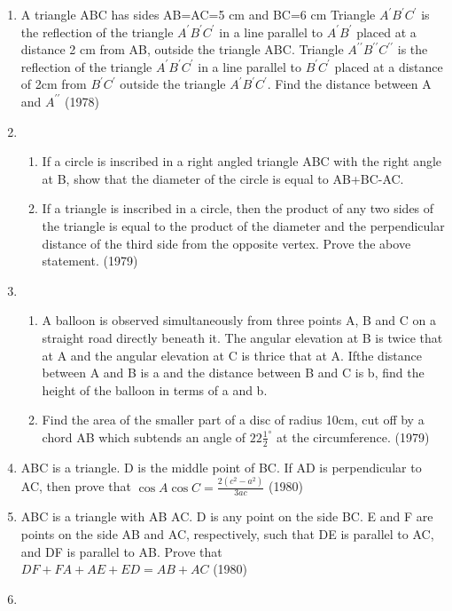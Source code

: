 \documentclass[12pt]{article}
\begin{document}
\begin{enumerate}
\item A triangle ABC has sides AB=AC=5 cm and BC=6 cm Triangle $A^{\prime} B^{\prime} C^{\prime}$ is the reflection of the triangle $A^{\prime} B^{\prime} C^{\prime}$ in a line parallel to $A^{\prime} B^{\prime}$ placed at a distance 2 cm from AB, outside the triangle ABC. Triangle $A^{\prime\prime} B^{\prime\prime} C^{\prime\prime}$ is the reflection of the triangle $A^{\prime} B^{\prime} C^{\prime}$ in a line parallel to $B^\prime C^\prime$ placed at a distance of 2cm from $B^{\prime} C^{\prime}$ outside the triangle $A^{\prime} B^{\prime} C^{\prime}$. Find the distance between A and $A^{\prime\prime}$ (1978)
\item 
\begin{enumerate}
\item If a circle is inscribed in a right angled triangle ABC with the right angle at B, show that the diameter of the circle is equal to AB+BC-AC.
\item  If a triangle is inscribed in a circle, then the product of any two sides of the triangle is equal to the product of the diameter and the perpendicular distance of the third side from the opposite vertex. Prove the above statement. (1979)
\end{enumerate}
\item 
\begin{enumerate}
\item A balloon is observed simultaneously from three points A, B and C on a straight road directly beneath it. The angular elevation at B is twice that at A and the angular
elevation at C is thrice that at A. Ifthe distance between A and B is a and the distance between B and C is b, find the height of the balloon in terms of a and b.
\item  Find the area of the smaller part of a disc of radius 10cm, cut off by a chord AB which subtends an angle of $22\frac{1}{2}^\circ$ at the circumference. (1979)
\end{enumerate}
\item  ABC is a triangle. D is the middle point of BC. If AD is perpendicular to AC, then prove that $\cos A\cos C=\frac{2(c^2-a^2)}{3ac}$ (1980)
\item ABC is a triangle with AB AC. D is any point on the side BC. E and F are points on the side AB and AC, respectively, such that DE is parallel to AC, and DF is parallel to AB. Prove that\\
 $DF+FA+AE+ED=AB+AC$ (1980)
\item 

\end{enumerate}
\end{document}
